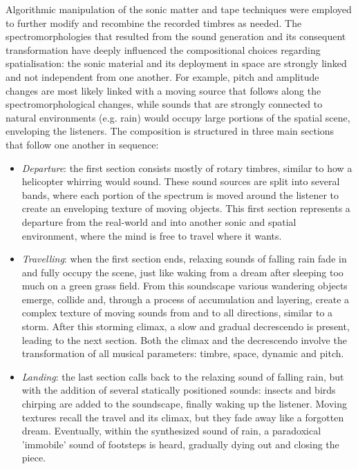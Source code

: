 \documentclass{article}
\begin{document}
        Algorithmic manipulation of the sonic matter and tape techniques were employed to further modify and recombine the recorded timbres as needed. The spectromorphologies that resulted from the sound generation and its consequent transformation have deeply influenced the compositional choices regarding spatialisation: the sonic material and its deployment in space are strongly linked and not independent from one another. For example, pitch and amplitude changes are most likely linked with a moving source that follows along the spectromorphological changes, while sounds that are strongly connected to natural environments (e.g. rain) would occupy large portions of the spatial scene, enveloping the listeners.
        The composition is structured in three main sections that follow one another in sequence:
        \begin{itemize}
            \item \textit{Departure}: the first section consists mostly of rotary timbres, similar to how a helicopter whirring would sound. These sound sources are split into several bands, where each portion of the spectrum is moved around the listener to create an enveloping texture of moving objects. This first section represents a departure from the real-world and into another sonic and spatial environment, where the mind is free to travel where it wants.
            \item \textit{Travelling}: when the first section ends, relaxing sounds of falling rain fade in and fully occupy the scene, just like waking from a dream after sleeping too much on a green grass field. From this soundscape various wandering objects emerge, collide and, through a process of accumulation and layering, create a complex texture of moving sounds from and to all directions, similar to a storm. After this storming climax, a slow and gradual decrescendo is present, leading to the next section. Both the climax and the decrescendo involve the transformation of all musical parameters: timbre, space, dynamic and pitch. 
            \item \textit{Landing}: the last section calls back to the relaxing sound of falling rain, but with the addition of several statically positioned sounds: insects and birds chirping are added to the soundscape, finally waking up the listener. Moving textures recall the travel and its climax, but they fade away like a forgotten dream. Eventually, within the synthesized sound of rain, a paradoxical 'immobile' sound of footsteps is heard, gradually dying out and closing the piece. 
        \end{itemize}
        
\end{document}
